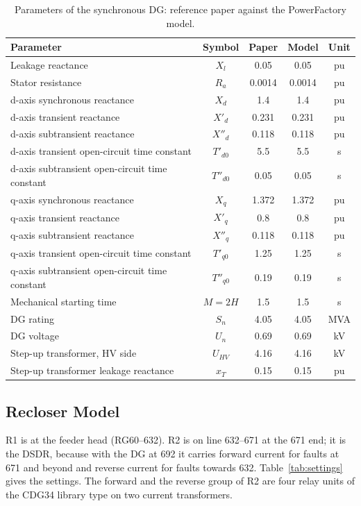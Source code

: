 \documentclass[12pt,letterpaper]{article}
\newcommand{\hd}{\rowcolor{headc}}
\newcommand{\PF}{PowerFactory}
\begin{document}
\begin{table}[H]
\centering\small
\begin{tabular}{@{}lcccc@{}}
\toprule
\hd\textbf{Parameter} & \textbf{Symbol} & \textbf{Paper} & \textbf{Model} & \textbf{Unit} \\
\midrule
Leakage reactance & $X_l$ & 0.05 & 0.05 & pu \\
Stator resistance & $R_a$ & 0.0014 & 0.0014 & pu \\
d-axis synchronous reactance & $X_d$ & 1.4 & 1.4 & pu \\
d-axis transient reactance & $X'_d$ & 0.231 & 0.231 & pu \\
d-axis subtransient reactance & $X''_d$ & 0.118 & 0.118 & pu \\
d-axis transient open-circuit time constant & $T'_{d0}$ & 5.5 & 5.5 & s \\
d-axis subtransient open-circuit time constant & $T''_{d0}$ & 0.05 & 0.05 & s \\
q-axis synchronous reactance & $X_q$ & 1.372 & 1.372 & pu \\
q-axis transient reactance & $X'_q$ & 0.8 & 0.8 & pu \\
q-axis subtransient reactance & $X''_q$ & 0.118 & 0.118 & pu \\
q-axis transient open-circuit time constant & $T'_{q0}$ & 1.25 & 1.25 & s \\
q-axis subtransient open-circuit time constant & $T''_{q0}$ & 0.19 & 0.19 & s \\
Mechanical starting time & $M = 2H$ & 1.5 & 1.5 & s \\
DG rating & $S_n$ & 4.05 & 4.05 & MVA \\
DG voltage & $U_n$ & 0.69 & 0.69 & kV \\
Step-up transformer, HV side & $U_{HV}$ & 4.16 & 4.16 & kV \\
Step-up transformer leakage reactance & $x_T$ & 0.15 & 0.15 & pu \\
\bottomrule
\end{tabular}
\caption{Parameters of the synchronous DG: reference paper against the \PF{} model.}
\label{tab:dg}
\end{table}

\subsection{Recloser Model}
R1 is at the feeder head (RG60--632). R2 is on line 632--671 at the 671 end; it is the DSDR, because with the
DG at 692 it carries forward current for faults at 671 and beyond and reverse current for faults towards 632.
Table~\ref{tab:settings} gives the settings. The forward and the reverse group of R2 are four relay units of
the CDG34 library type on two current transformers.
\end{document}
